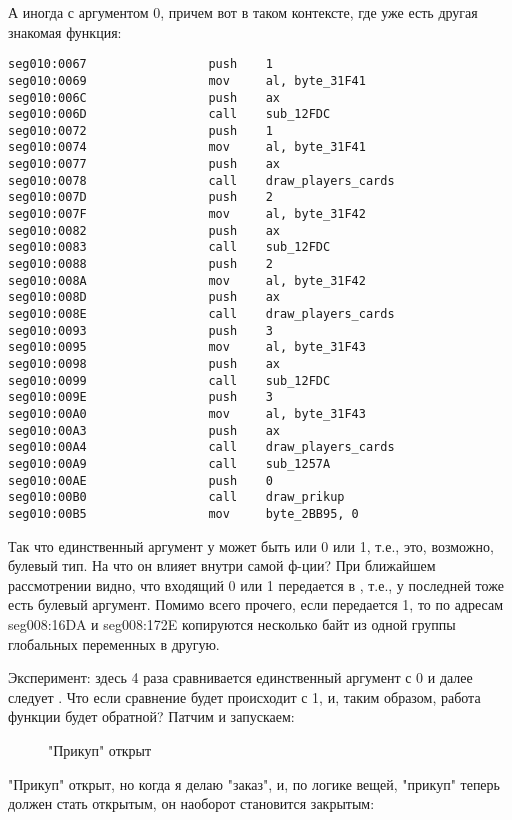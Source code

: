 А иногда с аргументом 0, причем вот в таком контексте, где уже есть другая знакомая функция:

\begin{lstlisting}
seg010:0067                 push    1
seg010:0069                 mov     al, byte_31F41
seg010:006C                 push    ax
seg010:006D                 call    sub_12FDC
seg010:0072                 push    1
seg010:0074                 mov     al, byte_31F41
seg010:0077                 push    ax
seg010:0078                 call    draw_players_cards
seg010:007D                 push    2
seg010:007F                 mov     al, byte_31F42
seg010:0082                 push    ax
seg010:0083                 call    sub_12FDC
seg010:0088                 push    2
seg010:008A                 mov     al, byte_31F42
seg010:008D                 push    ax
seg010:008E                 call    draw_players_cards
seg010:0093                 push    3
seg010:0095                 mov     al, byte_31F43
seg010:0098                 push    ax
seg010:0099                 call    sub_12FDC
seg010:009E                 push    3
seg010:00A0                 mov     al, byte_31F43
seg010:00A3                 push    ax
seg010:00A4                 call    draw_players_cards
seg010:00A9                 call    sub_1257A
seg010:00AE                 push    0
seg010:00B0                 call    draw_prikup
seg010:00B5                 mov     byte_2BB95, 0
\end{lstlisting}

Так что единственный аргумент у  может быть или 0 или 1, т.е., это, возможно, булевый тип.
На что он влияет внутри самой ф-ции?
При ближайшем рассмотрении видно, что входящий 0 или 1 передается в , т.е., у последней тоже есть
булевый аргумент.
Помимо всего прочего, если передается 1, то по адресам seg008:16DA и seg008:172E копируются несколько байт
из одной группы глобальных переменных в другую.

Эксперимент: здесь 4 раза сравнивается единственный аргумент с 0 и далее следует .
Что если сравнение будет происходит с 1, и, таким образом, работа функции  будет обратной?
Патчим и запускаем:

\begin{figure}[H]
\centering
{}
\caption{"Прикуп" открыт}
\end{figure}

"Прикуп" открыт, но когда я делаю "заказ", и, по логике вещей, "прикуп" теперь должен стать открытым,
он наоборот становится закрытым:

